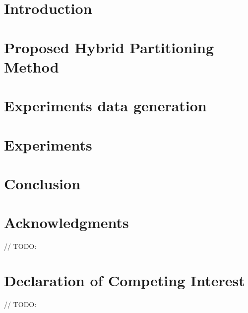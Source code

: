 \documentclass{TST}
\begin{document}
\maketitle


\section{Introduction}

\section{Proposed Hybrid Partitioning Method}


\section{Experiments data generation}


\section{Experiments}


\section{Conclusion}


\section*{Acknowledgments}
// TODO:

\section*{Declaration of Competing Interest}
// TODO:



\end{document}
